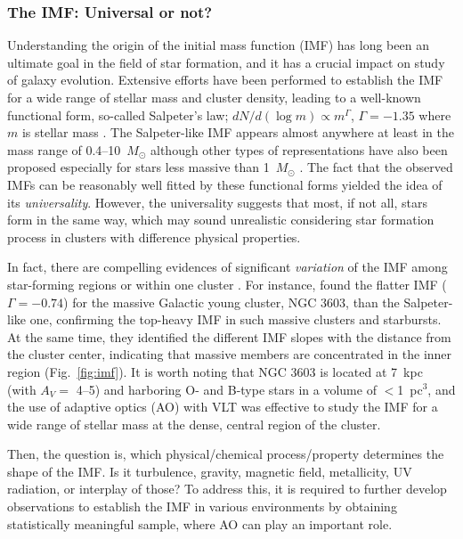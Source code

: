 \subsubsection{The IMF: Universal or not?}
Understanding the origin of the initial mass function (IMF) has long
been an ultimate goal in the field of star formation, and it has a
crucial impact on study of galaxy evolution. Extensive efforts have been
performed to establish the IMF for a wide range of stellar mass and
cluster density, leading to a well-known functional form, so-called
Salpeter's law; $dN/d(\log m) \propto m^{\Gamma}$, $\Gamma = -1.35$
where $m$ is stellar mass \citep{sal55}. The Salpeter-like IMF appears
almost anywhere at least in the mass range of 0.4--10~$M_{\odot}$
although other types of representations have also been proposed
especially for stars less massive than 1~$M_{\odot}$
\citep{mil79,sca86,sca98,kro01}. The fact that the observed IMFs can be
reasonably well fitted by these functional forms yielded the idea of its
{\it universality}. However, the universality suggests that most, if not
all, stars form in the same way, which may sound unrealistic considering
star formation process in clusters with difference physical properties. 

In fact, there are compelling evidences of significant {\it variation}
of the IMF among   star-forming regions or within one cluster
\citep{oas06,hil97}. For instance, \cite{har08} found the flatter IMF
($\Gamma = -0.74$) for the massive Galactic young cluster, NGC 3603,
than the Salpeter-like one, confirming the top-heavy IMF in such
massive clusters and starbursts. At the same time, they identified the
different IMF slopes with the distance from the cluster center,
indicating that massive members are concentrated in the inner region
(Fig.~\ref{fig:imf}). It is worth noting that NGC 3603 is located at
7~kpc (with $A_V =$ 4--5) and harboring O- and B-type stars in a volume
of $<$1~pc$^3$, and the use of adaptive optics (AO) with VLT was
effective to study the IMF for a wide range of stellar mass at the
dense, central region of the cluster. 

Then, the question is, which physical/chemical process/property
determines the shape of the IMF. Is it turbulence, gravity, magnetic
field, metallicity, UV radiation, or interplay of those? To address
this, it is required to further develop observations to establish the
IMF in various environments by obtaining statistically meaningful
sample, where AO can play an important role.  

